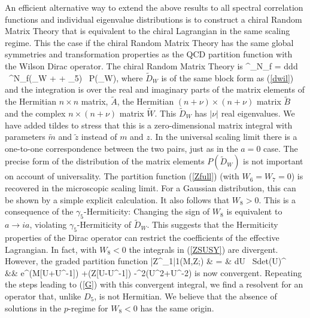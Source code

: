 \documentclass[aps,prl,twocolumn,superscriptaddress,preprintnumbers,floatfix,nofootinbib]{revtex4}
\begin{document}
 An efficient alternative way to
  extend the above results to all   
spectral correlation functions and  
individual eigenvalue distributions is to construct
a chiral Random Matrix Theory that is equivalent to  the
chiral Lagrangian in the same scaling regime. This the case
if the chiral Random Matrix Theory 
has  the same global symmetries and transformation
properties as the QCD partition function with the Wilson Dirac operator.
The chiral Random Matrix Theory is 
\be
{}^\nu_{N_f} = \int ddd  \  
{\det}^{N_f}(_W +  + \tilde{\gamma}_5) 
\ P(\tilde{D}_W), \:\;
\label{zwrmt}
\ee
where $\tilde{D}_W$ is of the same block form as (\ref{dwil})
and the integration is over the real and imaginary parts of the matrix
elements of the Hermitian $n \times n$ matrix, 
$\tilde{A}$, the Hermitian $(n+\nu) \times (n+\nu)$ matrix  $\tilde{B}$
and the  complex $n \times(n+\nu) $ matrix $\tilde{W}$.
This $\tilde{D}_W$ has $|\nu|$ real eigenvalues. 
We have added tildes to stress that this is a zero-dimensional matrix integral 
with parameters $\tilde{m}$ and $\tilde{z}$ instead of $m$ and $z$. In the
universal scaling limit there is a one-to-one correspondence
between the two pairs, just as in the $a=0$ case. The precise form of the
distribution of the matrix elements $P(\tilde{D}_W)$ is not important
on account of universality. The partition function (\ref{Zfull}) (with
$W_6=W_7=0$) is recovered in the microscopic scaling limit. 
For a Gaussian distribution, this can be shown by a
simple explicit calculation. It also follows that $W_8 > 0$.  
This is a consequence of the $\gamma_5$-Hermiticity:
Changing the sign of $W_8$ is equivalent to $a\to ia$, violating
$\gamma_5$-Hermiticity of $\tilde{D}_W$.
This suggests that the Hermiticity properties of the Dirac operator 
can restrict the coefficients of the effective Lagrangian. 
In fact, with $W_8<0$ the integrals in (\ref{ZSUSY}) are divergent. However,  
the graded partition function  
\be
\label{ZSUSYord}
\bar{Z}^\nu_{1|1}({\cal M},{\cal Z};\ha)  & = & \int \hspace{-1.5mm} dU \
{\rm Sdet}(U)^\nu \\
&& \hspace{-2.5cm}\times 
  e^{({\cal M}[U+U^{-1}])
    +\frac{1}{2}{\Str}({\cal Z}[U-U^{-1}])
    -\ha^2{{\Str}(U^2+U^{-2})}} \nn 
\ee
is now convergent.
Repeating the steps leading to (\ref{G}) with this convergent integral, 
we find a resolvent for an operator that, unlike $D_5$, is not
Hermitian. We believe that the absence of solutions in the $p$-regime
\cite{Sharpe} for $W_8<0$ has the same origin.
\end{document}
